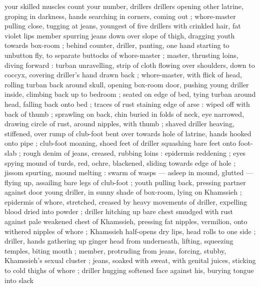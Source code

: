 {your skilled muscles{\thd} count your number, drillers{\td}} {\dashcom} drillers opening other latrine, groping in darkness, hands searching in corners, coming out ; whore-master pulling close, tugging at jeans, youngest of five drillers{\comdash} with crinkled hair, fat violet lips {\dashcom} member spurring jeans down over slope of thigh, dragging youth towards box-room ; behind counter, driller, panting, one hand starting to unbutton fly, to separate buttocks of whore-master ; master, thrusting loins, diving forward : turban unravelling, strip of cloth flowing over shoulders, down to coccyx, covering driller's hand drawn back ; whore-master, with flick of head, rolling turban back around skull, opening box-room door, pushing young driller inside, climbing back up to bedroom ; seated on edge of bed, tying turban around head, falling back onto bed ; traces of rust staining edge of arse : wiped off with back of thumb ; sprawling on back, chin buried in folds of neck, eye narrowed, drawing circle of rust, around nipples, with thumb ; shaved driller heaving, stiffened, over rump of club-foot bent over towards hole of latrine, hands hooked onto pipe ; club-foot moaning, shoed feet of driller squashing bare feet onto foot-slab ; rough denim of jeans, creased, rubbing loins : epidermis reddening ; eyes spying mound of turds, red, ochre, blackened, sliding towards edge of hole ; jissom spurting, mound melting : swarm of wasps --- asleep in mound, glutted --- flying up, assailing bare legs of club-foot ; youth pulling back, pressing partner against door {\semislash} young driller, in sunny shade of box-room, lying on Khamssieh ; epidermis of whore, stretched, creased by heavy movements of driller, expelling blood dried into powder ; driller hitching up bare chest smudged with rust against pale weakened chest of Khamssieh, pressing fat nipples, vermilion, onto withered nipples of whore ; Khamssieh half-opens dry lips, head rolls to one side ; driller, hands gathering up ginger head from underneath, lifting, squeezing temples, biting mouth ; member, protruding from jeans, forcing, stubby, Khamssieh's sexual cluster ; jeans, soaked with sweat, with genital juices, sticking to cold thighs of whore ; driller hugging softened face against his, burying tongue into slack 
